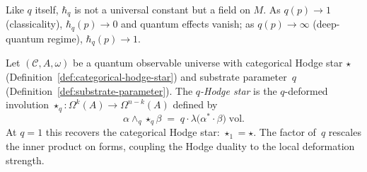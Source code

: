 \begin{remark}
\label{rem:planck-limits}
Like $q$ itself, $\hbar_q$ is not a universal constant but a field on $M$.
As $q(p) \to 1$ (classicality), $\hbar_q(p) \to 0$ and quantum effects
vanish; as $q(p) \to \infty$ (deep-quantum regime), $\hbar_q(p) \to 1$.
\end{remark}

\begin{definition}
\label{def:q-hodge-star}
Let $(\mathcal{C}, A, \omega)$ be a quantum observable universe with
categorical Hodge star $\star$
(Definition~\ref{def:categorical-hodge-star}) and substrate
parameter~$q$ (Definition~\ref{def:substrate-parameter}).  The
\emph{$q$-Hodge star} is the $q$-deformed involution
$\star_q \colon \Omega^k(A) \to \Omega^{n-k}(A)$ defined by
\[
  \alpha \wedge_q \star_q \beta
  \;=\; q \cdot \lambda\bigl(\alpha^* \cdot \beta\bigr)\;\mathrm{vol}.
\]
At $q = 1$ this recovers the categorical Hodge star:
$\star_1 = \star$.  The factor of~$q$ rescales the inner product on
forms, coupling the Hodge duality to the local deformation strength.
\end{definition}


